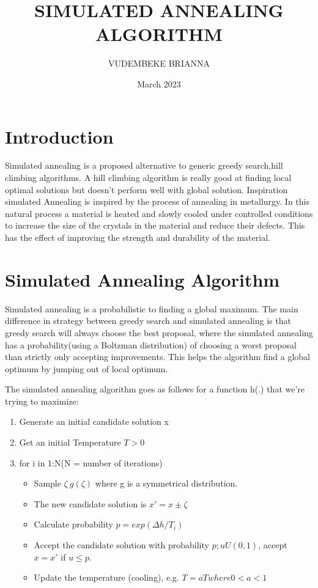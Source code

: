 \documentclass{article}
\title{SIMULATED ANNEALING ALGORITHM}
\author{VUDEMBEKE BRIANNA}
\date{March 2023}
\begin{document}
\maketitle

\section*{Introduction}
Simulated annealing is a proposed alternative to generic greedy search,hill climbing algorithms. A hill climbing algorithm is really good at finding local optimal solutions but doesn't perform well with global solution.
Inspiration simulated Annealing is inspired by the process of annealing in metallurgy. In this natural process a material is heated and slowly cooled under controlled conditions to increase the size of the crystals in the material and reduce their defects. This has the effect of improving the strength and durability of the material.
\section*{Simulated Annealing Algorithm}
Simulated annealing is a probabilistic to finding a global maximum.
The main difference in strategy between greedy search and simulated annealing is that greedy search will always choose the best proposal, where the simulated annealing has a probability(using a Boltzman distribution) of choosing a worst proposal than strictly only accepting improvements.
This helps the algorithm find a global optimum by jumping out of local optimum.

\noindent The simulated annealing algorithm goes as follows for a function h(.) that we're trying to maximize:
\begin{enumerate}
    \item Generate an initial candidate solution x
    \item Get an initial Temperature $ T > 0$
    \item for i in 1:N(N = number of iterations)
    \begin{itemize}
        \item Sample $ \zeta ~ g(\zeta)$ where g is a symmetrical distribution.
        \item The new candidate solution is $x' = x ± \zeta$
        \item Calculate probability $p=exp(\Delta h/T_{i})$
        \item  Accept the candidate solution with probability $p; u U(0, 1)$, accept $x = x'$ if $u \leq p.$
        \item Update the temperature (cooling), e.g. $T = aT where 0 < a < 1$
    \end{itemize}
\end{enumerate}
\end{document}
